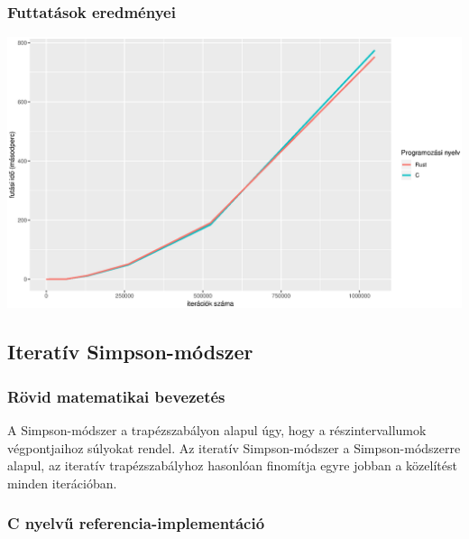 \subsubsection{Futtatások eredményei}

\includegraphics[width=15.5cm]{kepek/trapedozial_run.eps}

\subsection{Iteratív Simpson-módszer}

\subsubsection{Rövid matematikai bevezetés}

A Simpson-módszer a trapézszabályon alapul úgy, hogy a részintervallumok végpontjaihoz súlyokat rendel. Az iteratív Simpson-módszer a Simpson-módszerre alapul, az iteratív trapézszabályhoz hasonlóan finomítja egyre jobban a közelítést minden iterációban.

\subsubsection{C nyelvű referencia-implementáció}

